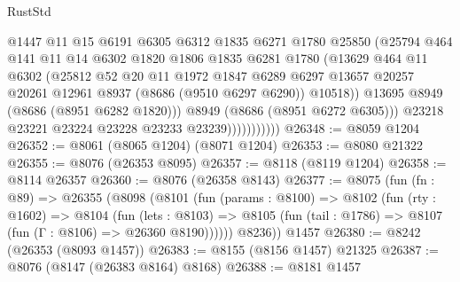 \begin{lexlean}{RustStd}
\begin{coremodule}
                            @1447
                            @11
                            @15
                            @6191
                            @6305
                            @6312
                            @1835
                            @6271
                            @1780
                            @25850
                            (@25794
                              @464
                              @141
                              @11
                              @14
                              @6302
                              @1820
                              @1806
                              @1835
                              @6281
                              @1780
                              (@13629
                                @464
                                @11
                                @6302
                                (@25812
                                  @52
                                  @20
                                  @11
                                  @1972
                                  @1847
                                  @6289
                                  @6297
                                  @13657
                                  @20257
                                  @20261
                                  @12961
                                  @8937
                                  (@8686 (@9510 @6297 @6290))
                                  @10518))
                              @13695
                              @8949
                              (@8686 (@8951 @6282 @1820)))
                            @8949
                            (@8686 (@8951 @6272 @6305)))
                          @23218
                          @23221
                          @23224
                          @23228
                          @23233
                          @23239)))))))))))
@26348 := @8059 @1204
@26352 := @8061 (@8065 @1204) (@8071 @1204)
@26353 := @8080 @21322
@26355 := @8076 (@26353 @8095)
@26357 := @8118 (@8119 @1204)
@26358 := @8114 @26357
@26360 := @8076 (@26358 @8143)
@26377 := @8075
    (fun (fn : @89) =>
    @26355
      (@8098
        (@8101
          (fun (params : @8100) =>
          @8102
            (fun (rty : @1602) =>
            @8104
              (fun (lets : @8103) =>
              @8105 (fun (tail : @1786) => @8107 (fun (Γ : @8106) => @26360 @8190))))))
        @8236))
    @1457
@26380 := @8242 (@26353 (@8093 @1457))
@26383 := @8155 (@8156 @1457) @21325
@26387 := @8076 (@8147 (@26383 @8164) @8168)
@26388 := @8181 @1457

\end{coremodule}
\end{lexlean}
